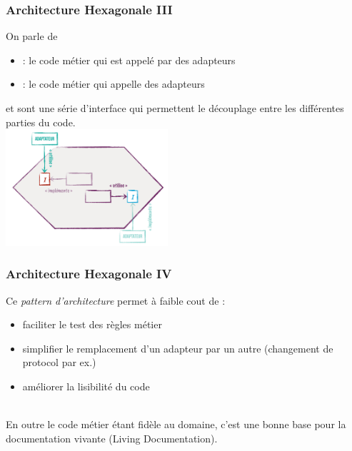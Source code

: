 \begin{frame}
	\frametitle{Architecture Hexagonale III}

    On parle de
	\begin{itemize}
    	\item \textbf{\color{blue}{API}} : le code m\'etier qui est appel\'e par des adapteurs
        \item \textbf{\color{blue}{SPI}} : le code m\'etier qui appelle des adapteurs
    \end{itemize}
	
	\textbf{\color{blue}{API}} et \textbf{\color{blue}{SPI}} sont une s\'erie d'interface qui permettent le d\'ecouplage entre les diff\'erentes parties du code.\\
	\includegraphics[width=6cm]{img/api_vs_spi1.png}
\end{frame}

\begin{frame}
	\frametitle{Architecture Hexagonale IV}

    Ce \textit{pattern d'architecture} permet \`a faible cout de :
	\begin{itemize}
    	\item faciliter le test des r\`egles m\'etier
        \item simplifier le remplacement d'un adapteur par un autre (changement de protocol par ex.)
		\item am\'eliorer la lisibilit\'e du code
    \end{itemize}
	
	~\\
	En outre le code m\'etier \'etant fid\`ele au domaine, c'est une bonne base pour la documentation vivante (Living Documentation).
\end{frame}

